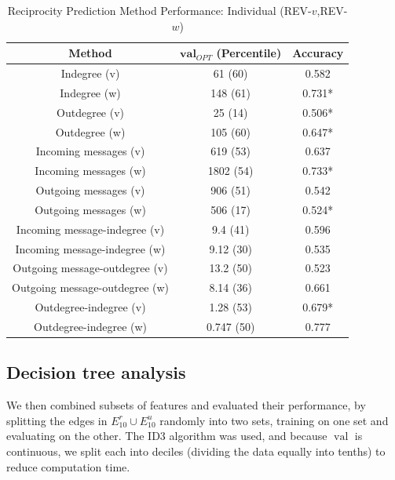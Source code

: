 \documentclass[conference]{IEEEtran}
\begin{document}
\begin{table}[!t]
\renewcommand{\arraystretch}{1.3}
\caption{Reciprocity Prediction Method Performance: Individual (REV-$v$,REV-$w$)}
\label{table_recresults_indivVW}
\centering
\begin{tabular}{|c||c|c|}
\hline
\bf{Method} & $\mathbf{val}_{OPT}$ (Percentile) & \bf{Accuracy} \\
\hline
Indegree (v) &  61 (60) & 0.582 \\
Indegree (w) & 148 (61) & 0.731* \\
Outdegree (v) & 25 (14) & 0.506* \\
Outdegree (w) & 105 (60) & 0.647* \\
\hline
Incoming messages (v) & 619 (53) & 0.637 \\
Incoming messages (w) & 1802 (54) & 0.733* \\
Outgoing messages (v) & 906 (51) & 0.542 \\
Outgoing messages (w) & 506 (17) & 0.524* \\
\hline
Incoming message-indegree (v) & 9.4 (41) & 0.596 \\
Incoming message-indegree (w) & 9.12 (30) & 0.535 \\
Outgoing message-outdegree (v) & 13.2 (50) & 0.523 \\
Outgoing message-outdegree (w) & 8.14 (36) & 0.661 \\
\hline
Outdegree-indegree (v) & 1.28 (53) & 0.679* \\
Outdegree-indegree (w) & 0.747 (50) & 0.777 \\
\hline
\end{tabular}
\end{table}

\subsection{Decision tree analysis}

We then combined subsets of features and evaluated their performance, by splitting the edges in $E^r_{10} \cup E_{10}^u$ randomly into two sets, training on one set and evaluating on the other. The ID3 algorithm was used, and because $\operatorname{val}$ is continuous, we split each into deciles (dividing the data equally into tenths) to reduce computation time.
\end{document}
